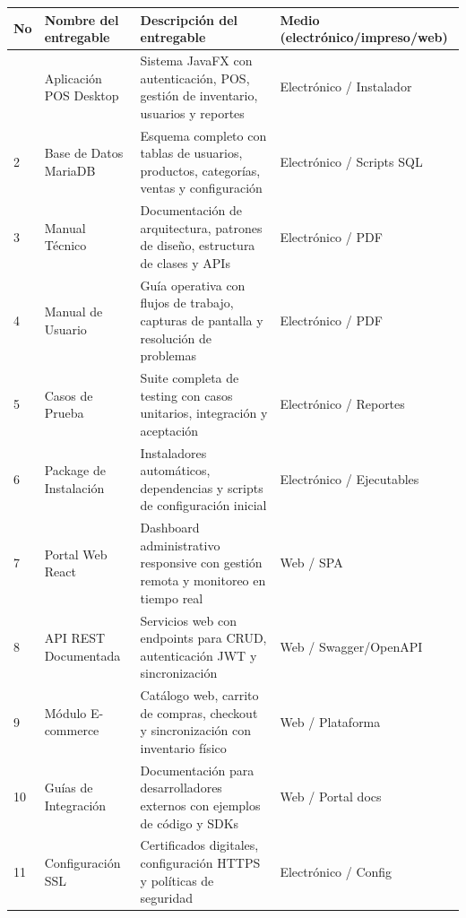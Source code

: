 \documentclass[12pt,letterpaper]{article}
\begin{document}
\begin{longtable}{|>{\centering}p{1cm}|p{6cm}|p{8cm}|>{\centering\arraybackslash}p{3cm}|}
\hline
\rowcolor{cobrablue!20}
\textbf{No} & \textbf{Nombre del entregable} & \textbf{Descripción del entregable} & \textbf{Medio (electrónico/impreso/web)} \\
\hline
\endhead

1 & Aplicación POS Desktop & Sistema JavaFX con autenticación, POS, gestión de inventario, usuarios y reportes & Electrónico / Instalador \\
\hline

2 & Base de Datos MariaDB & Esquema completo con tablas de usuarios, productos, categorías, ventas y configuración & Electrónico / Scripts SQL \\
\hline

3 & Manual Técnico & Documentación de arquitectura, patrones de diseño, estructura de clases y APIs & Electrónico / PDF \\
\hline

4 & Manual de Usuario & Guía operativa con flujos de trabajo, capturas de pantalla y resolución de problemas & Electrónico / PDF \\
\hline

5 & Casos de Prueba & Suite completa de testing con casos unitarios, integración y aceptación & Electrónico / Reportes \\
\hline

6 & Package de Instalación & Instaladores automáticos, dependencias y scripts de configuración inicial & Electrónico / Ejecutables \\
\hline

7 & Portal Web React & Dashboard administrativo responsive con gestión remota y monitoreo en tiempo real & Web / SPA \\
\hline

8 & API REST Documentada & Servicios web con endpoints para CRUD, autenticación JWT y sincronización & Web / Swagger/OpenAPI \\
\hline

9 & Módulo E-commerce & Catálogo web, carrito de compras, checkout y sincronización con inventario físico & Web / Plataforma \\
\hline

10 & Guías de Integración & Documentación para desarrolladores externos con ejemplos de código y SDKs & Web / Portal docs \\
\hline

11 & Configuración SSL & Certificados digitales, configuración HTTPS y políticas de seguridad & Electrónico / Config \\
\hline


\end{longtable}
\end{document}
